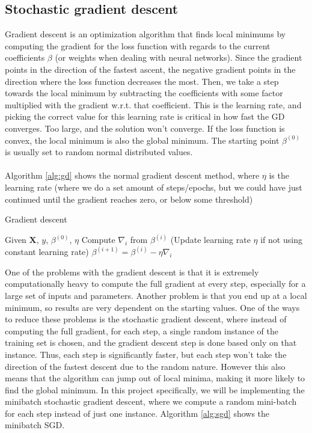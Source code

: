 \documentclass[a4paper]{article}
\newcommand{\XX}{\mathbf{X}}
\begin{document}
\subsection{Stochastic gradient descent} \label{sec:sgd}
Gradient descent is an optimization algorithm that finds local minimums by computing the gradient for the loss function with regards to the current coefficients $\beta$ (or weights when dealing with neural networks). Since the gradient points in the direction of the fastest ascent, the negative gradient points in the direction where the loss function decreases the most. Then, we take a step towards the local minimum by subtracting the coefficients with some factor multiplied with the gradient w.r.t. that coefficient. This is the learning rate, and picking the correct value for this learning rate is critical in how fast the GD converges. Too large, and the solution won't converge. If the loss function is convex, the local minimum is also the global minimum. The starting point $\beta^{(0)}$ is usually set to random normal distributed values.
\\\\
Algorithm \ref{alg:gd} shows the normal gradient descent method, where $\eta$ is the learning rate (where we do a set amount of steps/epochs, but we could have just continued until the gradient reaches zero, or below some threshold)
\begin{algorithm}[H]
\caption{Gradient descent}
\begin{algorithmic}[1]
\State Given $\XX$, $y$, $\beta^{(0)}$, $\eta$
\State Compute $\nabla_i$ from $\beta^{(i)}$
\State (Update learning rate $\eta$ if not using constant learning rate)
\State $\beta^{(i+1)} = \beta^{(i)} - \eta \nabla_i$
\EndFor
\end{algorithmic}
\label{alg:gd}
\end{algorithm}
One of the problems with the gradient descent is that it is extremely computationally heavy to compute the full gradient at every step, especially for a large set of inputs and parameters. Another problem is that you end up at a local minimum, so results are very dependent on the starting values. One of the ways to reduce these problems is the stochastic gradient descent, where instead of computing the full gradient, for each step, a single random instance of the training set is chosen, and the gradient descent step is done based only on that instance. Thus, each step is significantly faster, but each step won't take the direction of the fastest descent due to the random nature. However this also means that the algorithm can jump out of local minima, making it more likely to find the global minimum. In this project specifically, we will be implementing the minibatch stochastic gradient descent, where we compute a random mini-batch for each step instead of just one instance. Algorithm \ref{alg:sgd} shows the minibatch SGD.
\end{document}
